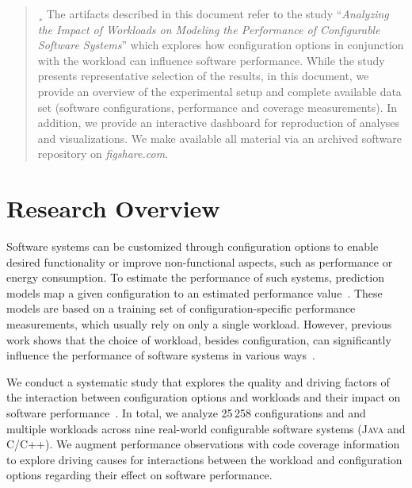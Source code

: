 \documentclass[10pt,conference]{IEEEtran}
\begin{document}
	\maketitle
	\setcounter{tocdepth}{4}
	
	\begin{abstract}¸
	The artifacts described in this document refer to the study ``\textit{Analyzing the Impact of Workloads on Modeling the Performance of Configurable Software Systems}'' which explores how configuration options in conjunction with the workload can influence software performance.
	While the study presents representative selection of the results, in this document, we provide an overview of the experimental setup and complete available data set (software configurations, performance and coverage measurements). In addition, we provide an interactive dashboard for reproduction of analyses and visualizations. We make available all material via an archived software repository on \textit{figshare.com}.
	\end{abstract}

	\section{Research Overview}
	Software systems can be customized through configuration options to enable desired functionality or improve non-functional aspects, such as performance or energy consumption. To estimate the performance of such systems, prediction models map a given configuration to an estimated performance value~\cite{kaltenecker_interplay_2020}. These models are based on a training set of configuration-specific performance measurements, which usually rely on only a single workload. However, previous work shows that the choice of workload, besides configuration, can significantly influence the performance of software systems in various ways~\cite{alves_sampling_2020,lesoil_2021}.  
	
	We conduct a systematic study that explores the quality and driving factors of the interaction between configuration options and workloads and their impact on software performance~\cite{muhlbauer_workload_2023}. In total, we analyze 25\,258 configurations and and multiple workloads across nine real-world configurable software systems (\textsc{Java} and \textsc{C}/\textsc{C++}). We augment performance observations with code coverage information to explore driving causes for interactions between the workload and configuration options regarding their effect on software performance. 
	
\end{document}
